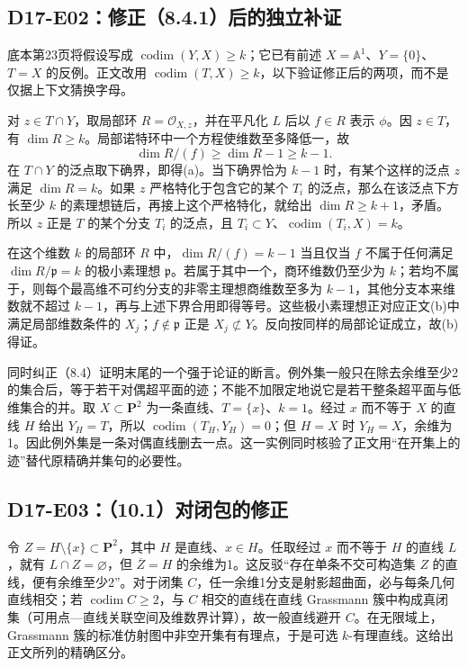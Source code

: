 \documentclass[UTF8,a4paper]{ctexbook}
\DeclareMathOperator{\codim}{codim}
\begin{document}
\subsection*{D17-E02：修正（8.4.1）后的独立补证}
底本第23页将假设写成 $\codim(Y,X)\geq k$；它已有前述 $X=\mathbb A^1$、$Y=\{0\}$、$T=X$ 的反例。正文改用 $\codim(T,X)\geq k$，以下验证修正后的两项，而不是仅据上下文猜换字母。

对 $z\in T\cap Y$，取局部环 $R=\mathcal O_{X,z}$，并在平凡化 $L$ 后以 $f\in R$ 表示 $\phi$。因 $z\in T$，有 $\dim R\geq k$。局部诺特环中一个方程使维数至多降低一，故
\[
\dim R/(f)\geq\dim R-1\geq k-1.
\]
在 $T\cap Y$ 的泛点取下确界，即得(a)。当下确界恰为 $k-1$ 时，有某个这样的泛点 $z$ 满足 $\dim R=k$。如果 $z$ 严格特化于包含它的某个 $T_i$ 的泛点，那么在该泛点下方长至少 $k$ 的素理想链后，再接上这个严格特化，就给出 $\dim R\geq k+1$，矛盾。所以 $z$ 正是 $T$ 的某个分支 $T_i$ 的泛点，且 $T_i\subset Y$、$\codim(T_i,X)=k$。

在这个维数 $k$ 的局部环 $R$ 中，$\dim R/(f)=k-1$ 当且仅当 $f$ 不属于任何满足 $\dim R/\mathfrak p=k$ 的极小素理想 $\mathfrak p$。若属于其中一个，商环维数仍至少为 $k$；若均不属于，则每个最高维不可约分支的非零主理想商维数至多为 $k-1$，其他分支本来维数就不超过 $k-1$，再与上述下界合用即得等号。这些极小素理想正对应正文(b)中满足局部维数条件的 $X_j$；$f\notin\mathfrak p$ 正是 $X_j\not\subset Y$。反向按同样的局部论证成立，故(b)得证。

同时纠正（8.4）证明末尾的一个强于论证的断言。例外集一般只在除去余维至少2的集合后，等于若干对偶超平面的迹；不能不加限定地说它是若干整条超平面与低维集合的并。取 $X\subset\mathbf P^2$ 为一条直线、$T=\{x\}$、$k=1$。经过 $x$ 而不等于 $X$ 的直线 $H$ 给出 $Y_H=T$，所以 $\codim(T_H,Y_H)=0$；但 $H=X$ 时 $Y_H=X$，余维为1。因此例外集是一条对偶直线删去一点。这一实例同时核验了正文用“在开集上的迹”替代原精确并集句的必要性。

\subsection*{D17-E03：（10.1）对闭包的修正}
令 $Z=H\setminus\{x\}\subset\mathbf P^2$，其中 $H$ 是直线、$x\in H$。任取经过 $x$ 而不等于 $H$ 的直线 $L$，就有 $L\cap Z=\varnothing$，但 $\overline Z=H$ 的余维为1。这反驳“存在单条不交可构造集 $Z$ 的直线，便有余维至少2”。对于闭集 $C$，任一余维1分支是射影超曲面，必与每条几何直线相交；若 $\codim C\geq2$，与 $C$ 相交的直线在直线 Grassmann 簇中构成真闭集（可用点—直线关联空间及维数界计算），故一般直线避开 $C$。在无限域上，Grassmann 簇的标准仿射图中非空开集有有理点，于是可选 $k$-有理直线。这给出正文所列的精确区分。
\end{document}
